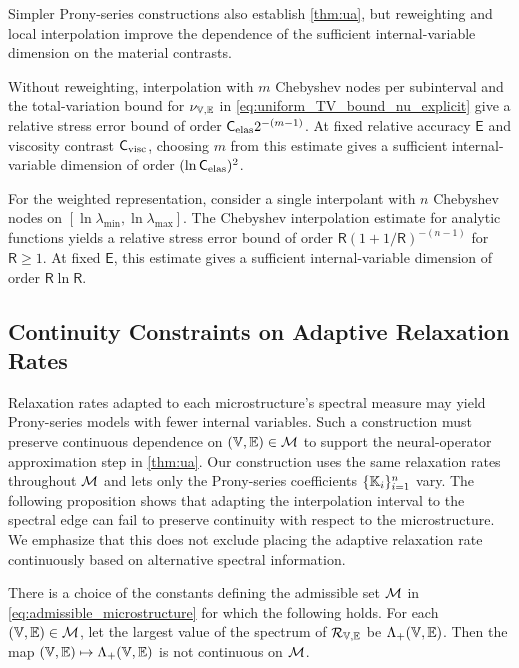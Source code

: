 \documentclass[3p, 12pt, preprint]{elsarticle}
\begin{document}
{\color{blue}
\begin{remark}\label{rmk:prony_construction_choices}
Simpler Prony-series constructions also establish \cref{thm:ua}, but reweighting and local interpolation improve the dependence of the sufficient internal-variable dimension on the material contrasts.

Without reweighting, interpolation with $m$ Chebyshev nodes per subinterval and the total-variation bound for $\nu_{\mathbb{V},\mathbb{E}}$ in \cref{eq:uniform_TV_bound_nu_explicit} give a relative stress error bound of order $\mathsf C_{\rm elas}2^{-(m-1)}$. At fixed relative accuracy $\mathsf E$ and viscosity contrast $\mathsf C_{\rm visc}$, choosing $m$ from this estimate gives a sufficient internal-variable dimension of order $(\ln\mathsf C_{\rm elas})^2$.

For the weighted representation, consider a single interpolant with $n$ Chebyshev nodes on $[\ln\lambda_{\min},\ln\lambda_{\max}]$. The Chebyshev interpolation estimate for analytic functions \cite[Theorem 8.2]{trefethen2019approximation} yields a relative stress error bound of order $\mathsf R(1+1/\mathsf R)^{-(n-1)}$ for $\mathsf R\ge1$. At fixed $\mathsf E$, this estimate gives a sufficient internal-variable dimension of order $\mathsf R\ln\mathsf R$.
\end{remark}
}

\subsection{Continuity Constraints on Adaptive Relaxation Rates}\label{subsec:ua_limits}


Relaxation rates adapted to each microstructure's spectral measure may yield Prony-series models with fewer internal variables. Such a construction must preserve continuous dependence on $(\mathbb{V},\mathbb{E})\in{\mathcal{M}}$ to support the neural-operator approximation step in \cref{thm:ua}. Our construction uses the same relaxation rates throughout ${\mathcal{M}}$ and lets only the Prony-series coefficients $\{\mathbb{K}_i\}_{i=1}^n$ vary. The following proposition shows that adapting the interpolation interval to the spectral edge can fail to preserve continuity with respect to the microstructure. We emphasize that this does not exclude placing the adaptive relaxation rate continuously based on alternative spectral information.

\begin{proposition}
\label{prop:no_spectral_stability}
There is a choice of the constants defining the admissible set ${\mathcal{M}}$
in \cref{eq:admissible_microstructure} for which the following holds.
For each $(\mathbb{V},\mathbb{E})\in{\mathcal{M}}$, let the largest value of the spectrum of
${\mathcal{R}}_{\mathbb{V},\mathbb{E}}$ be $\Lambda_+(\mathbb{V},\mathbb{E})$. Then the map $(\mathbb{V},\mathbb{E})\mapsto\Lambda_+(\mathbb{V},\mathbb{E})$ is not continuous on ${\mathcal{M}}$.
\end{proposition}
\end{document}
